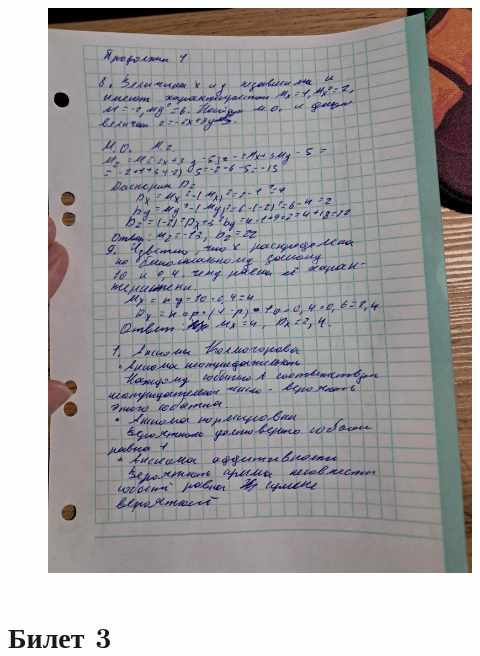 \documentclass{article}
\begin{document}
\begin{figure}[H]
    \centering
    \includegraphics[width=1\linewidth]{photo_5323477539961828014_y.jpg}
\end{figure}


\section{Билет 3}
\end{document}
